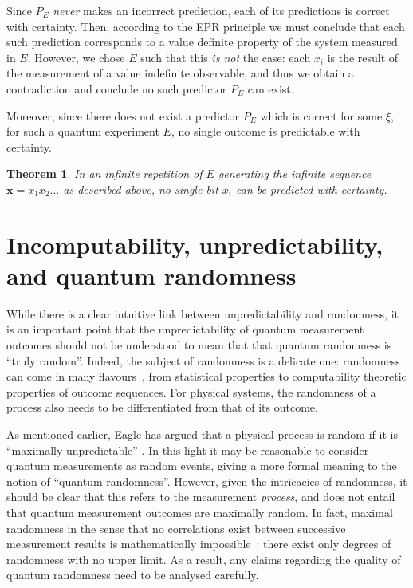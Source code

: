 \documentclass[%
 superscriptaddress,
 preprint,
 showpacs,
 showkeys,
 preprintnumbers,
 nofootinbib,
  amsmath,amssymb,
  aps,
 pra,
  longbibliography,
  floatfix,
 ]{revtex4-1}
\newtheorem{theorem}{Theorem}
\theoremstyle{definition}
\newcommand{\x}{\mathbf{x}}
\begin{document}
Since $P_E$ \emph{never} makes an incorrect prediction, each of its predictions is correct with certainty.
Then, according to the EPR principle we must conclude that each such prediction corresponds to a value definite property of the system measured in $E$.
However, we chose $E$ such that this {\it  is not}  the case: each $x_i$ is the result of the measurement of a value indefinite observable, and thus we obtain a contradiction and conclude no such predictor $P_E$ can exist.

Moreover, since there does not exist a predictor $P_E$ which is correct for some $\xi$, for such a quantum experiment $E$, no single outcome is predictable with certainty.
\begin{theorem} \label{unpredictsingle}
In an infinite repetition of $E$  generating the infinite sequence $\x=x_1x_2\dots$ as described above, no single bit $x_i$ can be predicted with certainty.
\end{theorem}


\section{Incomputability, unpredictability, and quantum randomness}

While there is a clear intuitive link between unpredictability and randomness, it is an important point that the unpredictability of quantum measurement outcomes should not be understood to mean that that quantum randomness is ``truly random''.
Indeed, the subject of randomness is a delicate one: randomness can come in many flavours~\cite{DH}, from statistical properties to computability theoretic properties of outcome sequences.
For physical systems, the randomness of a process also needs to be differentiated from that of its outcome.

As mentioned earlier, Eagle has argued that a physical process is random if it is ``maximally unpredictable'' \cite{Eagle:2005ys}.
In this light it may be reasonable to consider quantum measurements as random events, giving a more formal meaning to the notion of ``quantum randomness''.
However, given the intricacies of randomness, it should be clear that this refers to the measurement \emph{process}, and does not entail that quantum measurement outcomes are maximally random.
In fact, maximal randomness in the sense that no correlations exist between successive measurement results is mathematically impossible~\cite{GS-90,calude:02}: there exist only degrees of randomness with no upper limit.
As a result, any claims regarding the quality of quantum randomness need to be analysed carefully.
\end{document}
